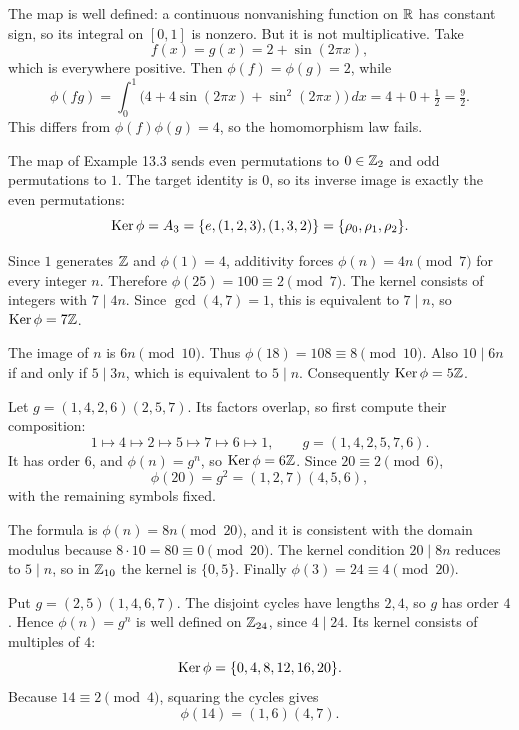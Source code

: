 The map is well defined: a continuous nonvanishing function on $\mathbb{R}$ has constant sign, so its integral on $[0,1]$ is nonzero. But it is not multiplicative. Take
\[f(x)=g(x)=2+\sin(2\pi x),\]
which is everywhere positive. Then $\phi(f)=\phi(g)=2$, while
\[\phi(fg)=\int_0^1\bigl(4+4\sin(2\pi x)+\sin^2(2\pi x)\bigr)\,dx=4+0+\tfrac12=\tfrac92.\]
This differs from $\phi(f)\phi(g)=4$, so the homomorphism law fails.

The map of Example 13.3 sends even permutations to $0\in\mathbb{Z}_2$ and odd permutations to $1$. The target identity is $0$, so its inverse image is exactly the even permutations:
\[\operatorname{Ker}\phi=A_3=\{e,(1,2,3),(1,3,2)\}=\{\rho_0,\rho_1,\rho_2\}.\]

Since $1$ generates $\mathbb{Z}$ and $\phi(1)=4$, additivity forces $\phi(n)=4n\pmod7$ for every integer $n$. Therefore $\phi(25)=100\equiv2\pmod7$. The kernel consists of integers with $7\mid4n$. Since $\gcd(4,7)=1$, this is equivalent to $7\mid n$, so $\operatorname{Ker}\phi=7\mathbb{Z}$.

The image of $n$ is $6n\pmod{10}$. Thus $\phi(18)=108\equiv8\pmod{10}$. Also $10\mid6n$ if and only if $5\mid3n$, which is equivalent to $5\mid n$. Consequently $\operatorname{Ker}\phi=5\mathbb{Z}$.

Let $g=(1,4,2,6)(2,5,7)$. Its factors overlap, so first compute their composition:
\[1\mapsto4\mapsto2\mapsto5\mapsto7\mapsto6\mapsto1,
\qquad g=(1,4,2,5,7,6).\]
It has order $6$, and $\phi(n)=g^n$, so $\operatorname{Ker}\phi=6\mathbb{Z}$. Since $20\equiv2\pmod6$,
\[\phi(20)=g^2=(1,2,7)(4,5,6),\]
with the remaining symbols fixed.

The formula is $\phi(n)=8n\pmod{20}$, and it is consistent with the domain modulus because $8\cdot10=80\equiv0\pmod{20}$. The kernel condition $20\mid8n$ reduces to $5\mid n$, so in $\mathbb{Z}_{10}$ the kernel is $\{0,5\}$. Finally $\phi(3)=24\equiv4\pmod{20}$.

Put $g=(2,5)(1,4,6,7)$. The disjoint cycles have lengths $2,4$, so $g$ has order $4$. Hence $\phi(n)=g^n$ is well defined on $\mathbb{Z}_{24}$, since $4\mid24$. Its kernel consists of multiples of $4$:
\[\operatorname{Ker}\phi=\{0,4,8,12,16,20\}.\]
Because $14\equiv2\pmod4$, squaring the cycles gives
\[\phi(14)=(1,6)(4,7).\]

